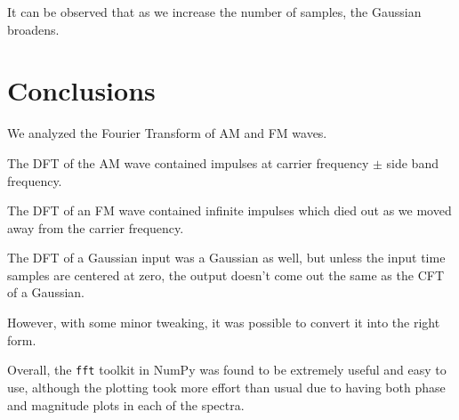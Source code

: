 \documentclass[12pt]{article}
\begin{document}
It can be observed that as we increase the number of samples, the Gaussian broadens.

\pagebreak
\section{Conclusions}
We analyzed the Fourier Transform of AM and FM waves.

The DFT of the AM wave contained impulses at carrier frequency $\pm$ side band frequency.

The DFT of an FM wave contained infinite impulses which died out as we moved away from the carrier frequency.

The DFT of a Gaussian input was a Gaussian as well, but unless the input time samples are centered at zero, the output doesn't come out the same as the CFT of a Gaussian.

However, with some minor tweaking, it was possible to convert it into the right form.

Overall, the \texttt{fft} toolkit in NumPy was found to be extremely useful and easy to use, although the plotting took more effort than usual due to having both phase and magnitude plots in each of the spectra.
\end{document}
